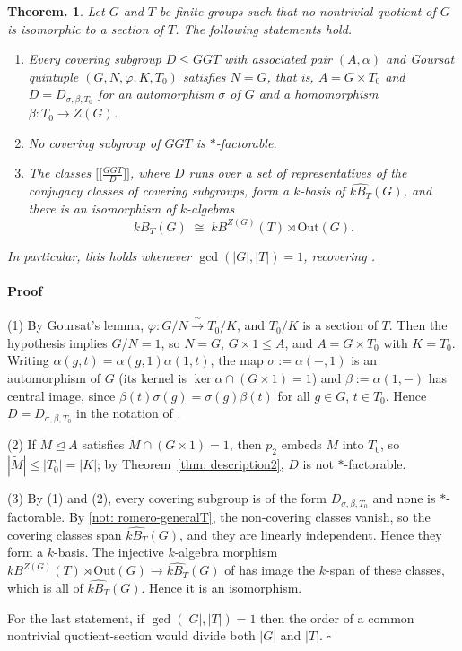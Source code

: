 \documentclass[12pt]{article}
\theoremstyle{change}
\newtheorem{theorem}{Theorem.}[section]
\newenvironment{proof}{\paragraph{Proof}}{\hfill$\square$}
\renewcommand{\le}{\leqslant} %
\newcommand{\Out}{\mathrm{Out}}
\newcommand{\1}{{\bf 1}}
\begin{document}
\begin{theorem}\label{thm: nosection}
Let $G$ and $T$ be finite groups such that no nontrivial quotient of $G$ is isomorphic to a section of $T$. The following statements hold.
\begin{enumerate}[leftmargin=2em]
  \item Every covering subgroup $D\le GGT$ with associated pair $(A,\alpha)$ and Goursat quintuple $(G,N,\varphi,K,T_0)$ satisfies $N=G$, that is, $A=G\times T_0$ and $D=D_{\sigma,\beta,T_0}$ for an automorphism $\sigma$ of $G$ and a homomorphism $\beta\colon T_0\to Z(G)$.
  \item No covering subgroup of $GGT$ is $\ast$-factorable.
  \item The classes $\big[\big[\tfrac{GGT}{D}\big]\big]$, where $D$ runs over a set of representatives of the conjugacy classes of covering subgroups, form a $k$-basis of $\widehat{kB_T}(G)$, and there is an isomorphism of $k$-algebras
        \[
        \widehat{kB_T}(G)\;\cong\;kB^{Z(G)}(T)\rtimes\Out(G).
        \]
\end{enumerate}
In particular, this holds whenever $\gcd(|G|,|T|)=1$, recovering \cite[Corollary 3.12]{R1}.
\end{theorem}
\begin{proof}
(1) By Goursat's lemma, $\varphi\colon G/N\xrightarrow{\ \sim\ }T_0/K$, and $T_0/K$ is a section of $T$. Then the hypothesis implies $G/N=1$, so $N=G$, $G\times 1\le A$, and $A=G\times T_0$ with $K=T_0$. Writing $\alpha(g,t)=\alpha(g,1)\alpha(1,t)$, the map $\sigma:=\alpha(-,1)$ is an automorphism of $G$ (its kernel is $\ker\alpha\cap(G\times 1)=1$) and $\beta:=\alpha(1,-)$ has central image, since $\beta(t)\sigma(g)=\sigma(g)\beta(t)$ for all $g\in G$, $t\in T_0$. Hence $D=D_{\sigma,\beta,T_0}$ in the notation of \cite[Section 3]{R1}.

(2) If $\widetilde M\trianglelefteq A$ satisfies $\widetilde M\cap(G\times 1)=1$, then $p_2$ embeds $\widetilde M$ into $T_0$, so $|\widetilde M|\le|T_0|=|K|$; by Theorem~\ref{thm: description2}, $D$ is not $\ast$-factorable.

(3) By (1) and (2), every covering subgroup is of the form $D_{\sigma,\beta,T_0}$ and none is $\ast$-factorable. By \ref{not: romero-generalT}, the non-covering classes vanish, so the covering classes span $\widehat{kB_T}(G)$, and they are linearly independent. Hence they form a $k$-basis. The injective $k$-algebra morphism $kB^{Z(G)}(T)\rtimes\Out(G)\to\widehat{kB_T}(G)$ of \cite[Theorem 3.11]{R1} has image the $k$-span of these classes, which is all of $\widehat{kB_T}(G)$. Hence it is an isomorphism.

For the last statement, if $\gcd(|G|,|T|)=1$ then the order of a common nontrivial quotient-section would divide both $|G|$ and $|T|$.
\end{proof}
\end{document}

